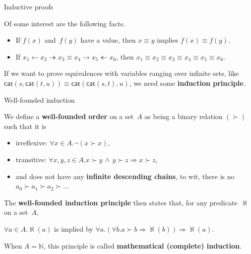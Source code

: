 \documentclass[compress,dvipdfmx]{beamer}
\newcommand\fun[1]{\textsf{#1}}
\begin{document}
%
\begin{frame}{Inductive proofs}

  Of some interest are the following facts.
  \begin{itemize}

    \item If \(f(x)\) and~\(f(y)\) have a value, then \(x \equiv y\)
      implies \(f(x) \equiv f(y)\).

    \item If \(x_1 \leftarrow x_2 \twoheadrightarrow x_3 \equiv x_4
      \rightarrow x_5 \twoheadleftarrow x_6\), then \(x_1 \equiv x_2
      \equiv x_3 \equiv x_4 \equiv x_5 \equiv x_6\).

  \end{itemize}

  If we want to prove equivalences with variables ranging over
  infinite sets, like \(\fun{cat}(s,\fun{cat}(t,u)) \equiv
  \fun{cat}(\fun{cat}(s,t),u)\), we need some \textbf{induction
  principle}.

\end{frame}

%
\begin{frame}{Well-founded induction}

We define a \textbf{well\hyp{}founded order} on a set~\(A\) as being a
binary relation \((\succ)\) such that it is
\begin{itemize}

  \item irreflexive: \(\forall x \in A. \neg(x \succ x)\),

  \item transitive: \(\forall x, y, z \in A. x \succ y \,\wedge\, y
    \succ z \Rightarrow x \succ z\),

  \item and does not have any \textbf{infinite descending chains}, to
    wit, there is no \(a_0 \succ a_1 \succ a_2 \succ \dots\)

\end{itemize}
The \textbf{well\hyp{}founded induction principle} then states that, for
any predicate~\(\aleph\) on a set~\(A\),
\begin{center}
  \(\forall a \in A.\aleph(a)\) is implied by \(\forall a.(\forall b.a
  \succ b \Rightarrow \aleph(b)) \Rightarrow \aleph(a)\).
\end{center}
When \(A=\mathbb{N}\), this principle is called \textbf{mathematical
(complete) induction}.

\end{frame}
\end{document}
